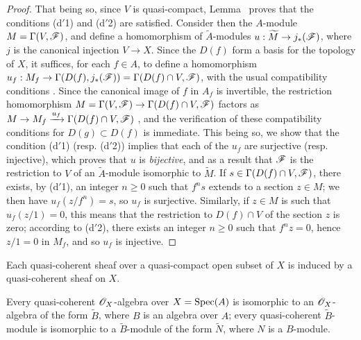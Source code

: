 \begin{proof}
That being so, since $V$ is quasi-compact, Lemma~ proves that
the conditions (d$'$1) and (d$'$2) are satisfied.
Consider then the $A$-module $M=\Gamma(V,\mathscr{F})$, and define a homomorphism of $\widetilde{A}$-modules $u:\widetilde{M}\to j_*(\sh{F})$, where $j$ is the canonical injection $V\to X$.
Since the $D(f)$ form a basis for the topology of $X$, it suffices, for each $f\in A$, to define a homomorphism $u_f:M_f\to\Gamma(D(f),j_*(\sh{F}))=\Gamma(D(f)\cap V,\sh{F})$, with the usual compatibility conditions .
Since the canonical image of $f$ in $A_f$ is invertible, the restriction homomorphism $M=\Gamma(V,\sh{F})\to\Gamma(D(f)\cap V,\sh{F})$ factors as $M\to M_f\xrightarrow{u_f}\Gamma(D(f)\cap V,\sh{F})$ , and the verification of these compatibility conditions for $D(g)\subset D(f)$ is immediate.
This being so, we show that the condition (d$'$1) (resp. (d$'$2)) implies that each of the $u_f$ are surjective (resp. injective), which proves that $u$ is \emph{bijective}, and as a result that $\mathscr{F}$ is the restriction to $V$ of an $\widetilde{A}$-module isomorphic to $\widetilde{M}$.
If $s\in\Gamma(D(f)\cap V,\mathscr{F})$, there exists, by (d$'$1), an integer $n\geq 0$ such that $f^n s$ extends to a section $z\in M$;
we then have $u_f(z/f^n)=s$, so $u_f$ is surjective.
Similarly, if $z\in M$ is such that $u_f(z/1)=0$, this means that the restriction to $D(f)\cap V$ of the section $z$ is zero;
according to (d$'$2), there exists an integer $n\geq 0$ such that $f^n z=0$, hence $z/1=0$ in $M_f$, and so $u_f$ is injective.
\end{proof}

\begin{corollary}[1.4.2]
\label{1.1.4.2}
Each quasi-coherent sheaf over a quasi-compact open subset of $X$ is induced by a quasi-coherent sheaf on $X$.
\end{corollary}

\begin{corollary}[1.4.3]
\label{1.1.4.3}
Every quasi-coherent $\mathscr{O}_X$-algebra over $X=\operatorname{Spec}(A)$ is isomorphic to an $\mathscr{O}_X$-algebra of the form $\widetilde{B}$, where $B$ is an algebra over $A$;
every quasi-coherent $\widetilde{B}$-module is isomorphic to a $\widetilde{B}$-module of the form $\widetilde{N}$, where $N$ is a $B$-module.
\end{corollary}

